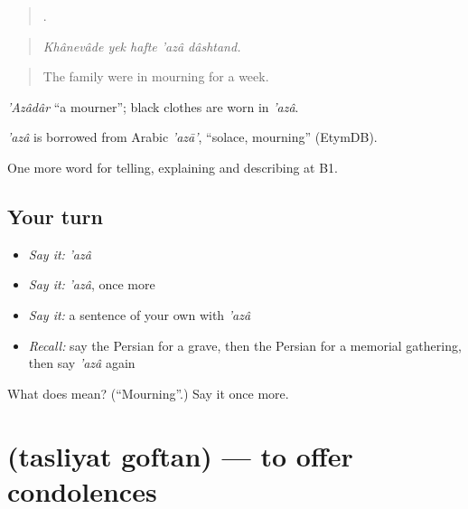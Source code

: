 \begin{quote}
    .
\end{quote}

\begin{quote}
\emph{Khânevâde yek hafte 'azâ dâshtand.}
\end{quote}

\begin{quote}
The family were in mourning for a week.
\end{quote}

\emph{'Azâdâr} \textquotedblleft{}a mourner\textquotedblright{}; black clothes are worn in \emph{'azâ}.

\begin{cousinweb}
\emph{'azâ} is borrowed from Arabic \emph{'azā'}, \textquotedblleft{}solace, mourning\textquotedblright{} (EtymDB).
\end{cousinweb}

\begin{grammarlens}[title={What you've built}]
One more word for telling, explaining and describing at B1.
\end{grammarlens}

\subsection*{Your turn}
\begin{itemize}
\raggedright
  \item \emph{Say it:} \emph{'azâ}
  \item \emph{Say it:} \emph{'azâ}, once more
  \item \emph{Say it:} a sentence of your own with \emph{'azâ}
  \item \emph{Recall:} say the Persian for a grave, then the Persian for a memorial gathering, then say \emph{'azâ} again
\end{itemize}

\begin{tcolorbox}[breakable,colback=teal!4,colframe=teal!35!black,title={Before you move on}]
What does  mean? (\textquotedblleft{}Mourning\textquotedblright{}.) Say it once more.
\end{tcolorbox}
\section[\texorpdfstring{\fa{تسلیت} \fa{گفتن} (tasliyat goftan)}{تسلیت گفتن (tasliyat goftan)}]{  (tasliyat goftan) — to offer condolences}

